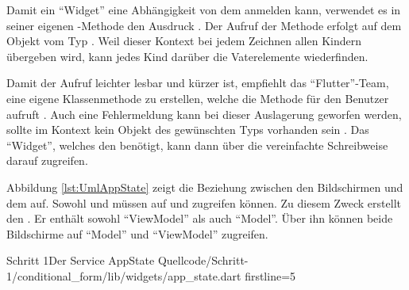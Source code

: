 Damit ein \enquote{Widget} eine Abhängigkeit von dem  anmelden kann, verwendet es in seiner eigenen -Methode den Ausdruck .
Der Aufruf der Methode erfolgt auf dem Objekt vom Typ .
Weil dieser Kontext bei jedem Zeichnen allen Kindern übergeben wird, kann jedes Kind darüber die Vaterelemente wiederfinden.

Damit der Aufruf leichter lesbar und kürzer ist, empfiehlt das \enquote{Flutter}-Team, eine eigene Klassenmethode zu erstellen, welche die Methode für den Benutzer aufruft .
Auch eine Fehlermeldung kann bei dieser Auslagerung geworfen werden, sollte im Kontext kein Objekt des gewünschten Typs vorhanden sein .
Das \enquote{Widget}, welches den  benötigt, kann dann über die vereinfachte Schreibweise  darauf zugreifen.

Abbildung \ref{lst:UmlAppState} zeigt die Beziehung zwischen den Bildschirmen und dem  auf.
Sowohl  und  müssen auf  und  zugreifen können.
Zu diesem Zweck erstellt  den .
Er enthält sowohl \enquote{ViewModel} als auch \enquote{Model}.
Über ihn können beide Bildschirme auf \enquote{Model} und \enquote{ViewModel} zugreifen.



\begin{alexlisting}{Schritt 1}{Der Service AppState}
  {Quellcode/Schritt-1/conditional_form/lib/widgets/app_state.dart}
  {firstline=5}
  \label{lst:Schritt1DerServiceAppState}
\end{alexlisting}


